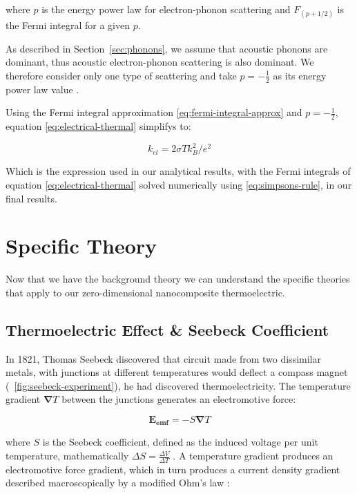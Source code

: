 \documentclass[12pt]{article}
\newcommand{\figref}[2][\figurename~]{#1\ref{#2}}
\newcommand{\secref}[2][Section~]{#1\ref{#2}}
\renewcommand{\vec}[1]{\mathbf{#1}}
\begin{document}
where $p$ is the energy power law for electron-phonon scattering and $F_{(p + 1/2)}$ is the Fermi integral for a given $p$.

As described in \secref{sec:phonons}, we assume that acoustic phonons are dominant, thus acoustic electron-phonon scattering is also dominant. We therefore consider only one type of scattering and take $p = -\frac{1}{2}$ as its energy power law value \cite{drabble}.

Using the Fermi integral approximation \eqref{eq:fermi-integral-approx} and $p = -\frac{1}{2}$, equation \eqref{eq:electrical-thermal} simplifys to:

\begin{equation}
\label{eq:electrical-thermal-approx}
	k_{el}= 2\sigma T k_B^2/e^2
\end{equation}

Which is the expression used in our analytical results, with the Fermi integrals of equation \eqref{eq:electrical-thermal} solved numerically using \eqref{eq:simpsons-rule}, in our final results.

\section{Specific Theory}
Now that we have the background theory we can understand the specific theories that apply to our zero-dimensional nanocomposite thermoelectric.

\subsection{Thermoelectric Effect \& Seebeck Coefficient}
\label{sec:thermoelectricity}
In 1821, Thomas Seebeck discovered that circuit made from two dissimilar metals, with junctions at different temperatures would deflect a compass magnet (\figref{fig:seebeck-experiment}), he had discovered thermoelectricity. The temperature gradient $\vec{\nabla} T$ between the junctions generates an electromotive force:

\begin{equation}
\label{seebeck-emf}
	\vec{E_{emf}} = -S \vec{\nabla} T
\end{equation}

where $S$ is the Seebeck coefficient, defined as the induced voltage per unit temperature, mathematically $\Delta S = \frac{\Delta V}{\Delta T}$ \cite{modern-thermoelectrics}. A temperature gradient produces an electromotive force gradient, which in turn produces a current density gradient described macroscopically by a modified Ohm's law \cite{kittel}:
\end{document}
